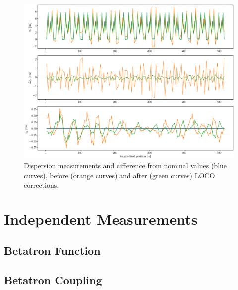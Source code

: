 \begin{figure}
\centering
\includegraphics[width=1.0\textwidth]{figures/nominal_measured_dispersion_after_before_loco.eps}
\caption{Dispersion measurements and difference from nominal values (blue curves), before (orange curves) and after (green curves) LOCO corrections.}
\label{fig:disp_error}
\end{figure}


\section{Independent Measurements}
\subsection{Betatron Function}
\subsection{Betatron Coupling}

